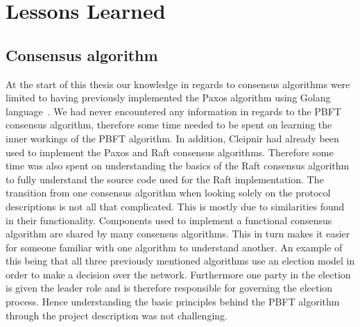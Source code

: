 \section{Lessons Learned}
\iffalse
-PBFT
-Asynchronous programming with C#, Task architecture
-Reactive Programming basics
-Overall knowledge for Cleipnir
-Issues and advantages in regards to the topics listed over. For instance a lot of time was wasted due to not fully grasping how Cleipnir work internally when performing the reactive part and the CAwaitable emission --> resulting a month of frustration trying to figure out why collision errors occur.
-Lack of documentation can be quite fatal for continued support.
-The multitude of potential issues that could occur that aren't necessary dealt with in the theoretical consensus algorithm or pseudo code.
-Cleipnir and how it interacts with the other programming paradigms. Eks: A clear distinction has to made in regards to what code is run inside Cleipnir(the persistent part) and what is not called in Cleipnir (orthogonal part), mixing these will cause disastrous results, which we infact encountered several times during implementation.
\fi

\subsection{Consensus algorithm}
At the start of this thesis our knowledge in regards to consensus algorithms were limited to having previously implemented the Paxos algorithm using Golang language~\cite{WEB:golangmainpage}. We had never encountered any information in regards to the PBFT consensus algorithm, therefore some time needed to be spent on learning the inner workings of the PBFT algorithm. In addition, Cleipnir had already been used to implement the Paxos and Raft consensus algorithms. Therefore some time was also spent on understanding the basics of the Raft consensus algorithm to fully understand the source code used for the Raft implementation. The transition from one consensus algorithm when looking solely on the protocol descriptions is not all that complicated. This is mostly due to similarities found in their functionality. Components used to implement a functional consensus algorithm are shared by many consensus algorithms. This in turn makes it easier for someone familiar with one algorithm to understand another. An example of this being that all three previously mentioned algorithms use an election model in order to make a decision over the network. Furthermore one party in the election is given the leader role and is therefore responsible for governing the election process. Hence understanding the basic principles behind the PBFT algorithm through the project description was not challenging.

